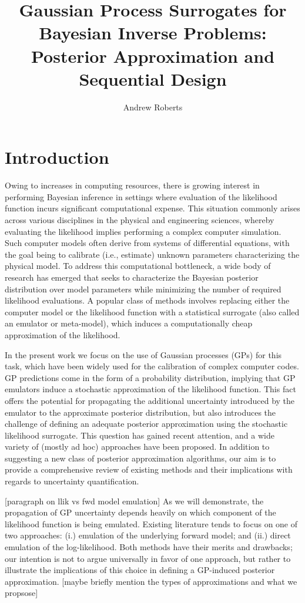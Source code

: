 \documentclass[12pt]{article}
\title{Gaussian Process Surrogates for Bayesian Inverse Problems: Posterior Approximation and Sequential Design}
\author{Andrew Roberts}
\begin{document}
\maketitle

\section{Introduction}
Owing to increases in computing resources, there is growing interest in performing Bayesian inference in settings 
where evaluation of the likelihood function incurs significant computational expense. This situation commonly 
arises across various disciplines in the physical and engineering sciences, whereby evaluating the likelihood 
implies performing a complex computer simulation. Such computer models often derive from systems of differential 
equations, with the goal being to calibrate (i.e., estimate) unknown parameters characterizing the physical model.
To address this computational bottleneck, a wide body of research has emerged that seeks to characterize the Bayesian 
posterior distribution over model parameters while minimizing the number of required likelihood evaluations. 
A popular class of methods involves replacing either the computer model or the likelihood function with a statistical 
surrogate (also called an emulator or meta-model), which induces a computationally cheap approximation of the likelihood.

In the present work we focus on the use of Gaussian processes (GPs) for this task, which have been widely used for the 
calibration of complex computer codes. GP predictions come in the form of a probability distribution, implying that GP 
emulators induce a stochastic approximation of the likelihood function. This fact offers the potential for propagating the 
additional uncertainty introduced by the emulator to the approximate posterior distribution, but also introduces the challenge 
of defining an adequate posterior approximation using the stochastic likelihood surrogate. This question has gained recent 
attention, and a wide variety of (mostly ad hoc) approaches have been proposed. In addition to suggesting a new class of 
posterior approximation algorithms, our aim is to provide a comprehensive review of existing methods and their implications 
with regards to uncertainty quantification.

[paragraph on llik vs fwd model emulation] As we will demonstrate, the propagation of GP uncertainty depends heavily 
on which component of the likelihood function is being emulated. Existing literature tends to focus on one of two approaches:
(i.) emulation of the underlying forward model; and (ii.) direct emulation of the log-likelihood. Both methods have their 
merits and drawbacks; our intention is not to argue universally in favor of one approach, but rather to illustrate the 
implications of this choice in defining a GP-induced posterior approximation. [maybe briefly mention the types of approximations and what we propsose] 
\end{document}

